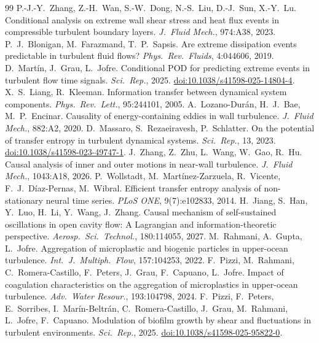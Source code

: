 \documentclass[11pt]{article}
\begin{document}
\begin{thebibliography}{99}
 P.-J.-Y.\ Zhang, Z.-H.\ Wan, S.-W.\ Dong, N.-S.\ Liu, D.-J.\ Sun, X.-Y.\ Lu. Conditional analysis on extreme wall shear stress and heat flux events in compressible turbulent boundary layers. \emph{J.\ Fluid Mech.}, 974:A38, 2023.
 P.\ J.\ Blonigan, M.\ Farazmand, T.\ P.\ Sapsis. Are extreme dissipation events predictable in turbulent fluid flows? \emph{Phys.\ Rev.\ Fluids}, 4:044606, 2019.
 D.\ Mart\'in, J.\ Grau, L.\ Jofre. Conditional POD for predicting extreme events in turbulent flow time signals. \emph{Sci.\ Rep.}, 2025. \href{https://doi.org/10.1038/s41598-025-14804-4}{doi:10.1038/s41598-025-14804-4}.
 X.\ S.\ Liang, R.\ Kleeman. Information transfer between dynamical system components. \emph{Phys.\ Rev.\ Lett.}, 95:244101, 2005.
 A.\ Lozano-Dur\'an, H.\ J.\ Bae, M.\ P.\ Encinar. Causality of energy-containing eddies in wall turbulence. \emph{J.\ Fluid Mech.}, 882:A2, 2020.
 D.\ Massaro, S.\ Rezaeiravesh, P.\ Schlatter. On the potential of transfer entropy in turbulent dynamical systems. \emph{Sci.\ Rep.}, 13, 2023. \href{https://doi.org/10.1038/s41598-023-49747-1}{doi:10.1038/s41598-023-49747-1}.
 J.\ Zhang, Z.\ Zhu, L.\ Wang, W.\ Gao, R.\ Hu. Causal analysis of inner and outer motions in near-wall turbulence. \emph{J.\ Fluid Mech.}, 1043:A18, 2026.
 P.\ Wollstadt, M.\ Mart\'inez-Zarzuela, R.\ Vicente, F.\ J.\ D\'iaz-Pernas, M.\ Wibral. Efficient transfer entropy analysis of non-stationary neural time series. \emph{PLoS ONE}, 9(7):e102833, 2014.
 H.\ Jiang, S.\ Han, Y.\ Luo, H.\ Li, Y.\ Wang, J.\ Zhang. Causal mechanism of self-sustained oscillations in open cavity flow: A Lagrangian and information-theoretic perspective. \emph{Aerosp.\ Sci.\ Technol.}, 180:114055, 2027.
 M.\ Rahmani, A.\ Gupta, L.\ Jofre. Aggregation of microplastic and biogenic particles in upper-ocean turbulence. \emph{Int.\ J.\ Multiph.\ Flow}, 157:104253, 2022.
 F.\ Pizzi, M.\ Rahmani, C.\ Romera-Castillo, F.\ Peters, J.\ Grau, F.\ Capuano, L.\ Jofre. Impact of coagulation characteristics on the aggregation of microplastics in upper-ocean turbulence. \emph{Adv.\ Water Resour.}, 193:104798, 2024.
 F.\ Pizzi, F.\ Peters, E.\ Sorribes, I.\ Mar\'in-Beltr\'an, C.\ Romera-Castillo, J.\ Grau, M.\ Rahmani, L.\ Jofre, F.\ Capuano. Modulation of biofilm growth by shear and fluctuations in turbulent environments. \emph{Sci.\ Rep.}, 2025. \href{https://doi.org/10.1038/s41598-025-95822-0}{doi:10.1038/s41598-025-95822-0}.

\end{thebibliography}
\end{document}
